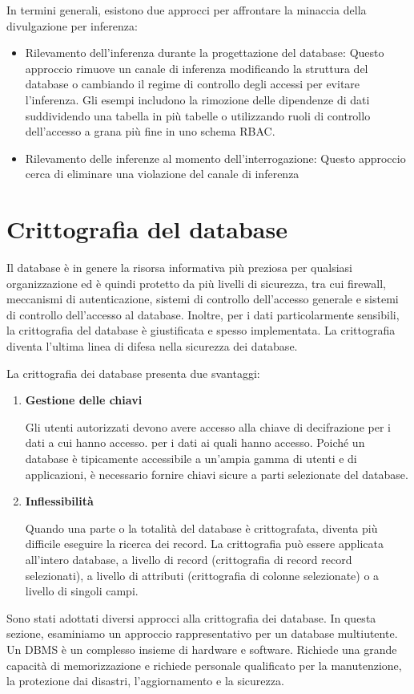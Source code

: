 \singlespacing

In termini generali, esistono due approcci per affrontare la minaccia della divulgazione per inferenza:

\begin{itemize}
    \item Rilevamento dell'inferenza durante la progettazione del database: Questo approccio rimuove un canale di inferenza modificando la struttura del database o cambiando il regime di controllo degli accessi per evitare l'inferenza.  Gli esempi includono la rimozione delle dipendenze di dati suddividendo una tabella in più tabelle o utilizzando ruoli di controllo dell'accesso a grana più fine in uno schema RBAC.

    \item Rilevamento delle inferenze al momento dell'interrogazione: Questo approccio cerca di eliminare una violazione del canale di inferenza
\end{itemize}
\newpage
\section{Crittografia del database}
Il database è in genere la risorsa informativa più preziosa per qualsiasi organizzazione ed è quindi protetto da più livelli di sicurezza, tra cui firewall, meccanismi di autenticazione, sistemi di controllo dell'accesso generale e sistemi di controllo dell'accesso al database. Inoltre, per i dati particolarmente sensibili, la crittografia del database è giustificata e spesso implementata. La crittografia diventa l'ultima linea di difesa nella sicurezza dei database.

\singlespacing

La crittografia dei database presenta due svantaggi:

\begin{enumerate}
    \item \textbf{Gestione delle chiavi}
    
    Gli utenti autorizzati devono avere accesso alla chiave di decifrazione per i dati a cui hanno accesso. per i dati ai quali hanno accesso. Poiché un database è tipicamente accessibile a un'ampia gamma di utenti e di applicazioni, è necessario fornire chiavi sicure a parti selezionate del database. 
    
    \item \textbf{Inflessibilità}
    
    Quando una parte o la totalità del database è crittografata, diventa più difficile eseguire la ricerca dei record. La crittografia può essere applicata all'intero database, a livello di record (crittografia di record record selezionati), a livello di attributi (crittografia di colonne selezionate) o a livello di singoli campi.
\end{enumerate}
Sono stati adottati diversi approcci alla crittografia dei database. In questa sezione, esaminiamo un approccio rappresentativo per un database multiutente. Un DBMS è un complesso insieme di hardware e software. Richiede una grande
capacità di memorizzazione e richiede personale qualificato per la manutenzione, la protezione dai disastri, l'aggiornamento e la sicurezza.

